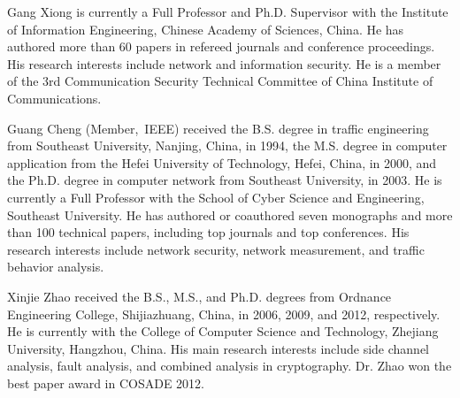 \begin{IEEEbiography}
{Gang Xiong} is currently a Full Professor and Ph.D. Supervisor with the Institute of Information Engineering, Chinese Academy of Sciences, China. He has authored more than 60 papers in refereed journals and conference proceedings. His research interests include network and information security. He is a member of the 3rd Communication Security Technical Committee of China Institute of Communications.
\end{IEEEbiography}
\vfill
\newpage
\begin{IEEEbiography}
{Guang Cheng} (Member,~IEEE) received the B.S. degree in traffic engineering from Southeast University, Nanjing, China, in 1994, the M.S. degree in computer application from the Hefei University of Technology, Hefei, China, in 2000, and the Ph.D. degree in computer network from Southeast University, in 2003.
He is currently a Full Professor with the School of Cyber Science and Engineering, Southeast University. He has authored or coauthored seven monographs and more than 100
technical papers, including top journals and top conferences. 
His research interests include network security, network measurement, and traffic behavior analysis.
\end{IEEEbiography}

\begin{IEEEbiography}
{Xinjie Zhao} received the B.S., M.S., and Ph.D. degrees from Ordnance Engineering College, Shijiazhuang, China, in 2006, 2009, and 2012, respectively.
He is currently with the College of Computer Science and Technology, Zhejiang University, Hangzhou, China. His main research interests include side channel analysis, fault analysis, and combined analysis in cryptography.
Dr. Zhao won the best paper award in COSADE 2012.
\end{IEEEbiography}

